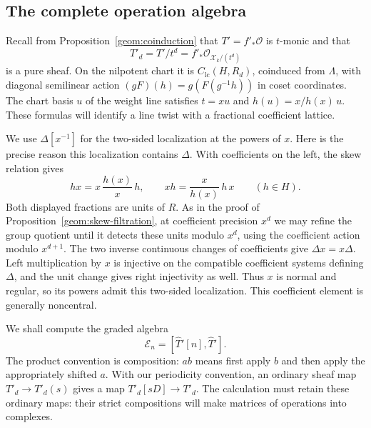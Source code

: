 \subsection{The complete operation algebra}

Recall from Proposition~\ref{geom:coinduction} that
$T'=f'_*\mathcal O$ is $t$-monic and that
\[
 T'_d=T'/t^d=f'_*\mathcal O_{\mathcal X_k/(t^d)}
\]
is a pure sheaf. On the nilpotent chart it is
$C_{\mathrm{lc}}(H,R_d)$, coinduced from $\Lambda$, with diagonal
semilinear action $(gF)(h)=g(F(g^{-1}h))$ in coset coordinates.
The chart basis $u$ of the weight line satisfies $t=xu$ and
$h(u)=x/h(x)\,u$. These formulas will identify a line twist with a
fractional coefficient lattice.

We use $\Delta[x^{-1}]$ for the two-sided localization at the powers
of $x$. Here is the precise reason this localization contains
$\Delta$. With coefficients on the left, the skew relation gives
\[
 hx=x\,\frac{h(x)}x\,h,
 \qquad
 xh=\frac{x}{h(x)}\,h\,x
 \qquad(h\in H).
\]
Both displayed fractions are units of $R$. As in the proof of
Proposition~\ref{geom:skew-filtration}, at coefficient precision
$x^d$ we may refine the group quotient until it detects these units
modulo $x^d$, using the coefficient action modulo $x^{d+1}$.
The two inverse continuous changes of coefficients give
$\Delta x=x\Delta$. Left multiplication by $x$ is injective on
the compatible coefficient systems defining $\Delta$, and the unit
change gives right injectivity as well. Thus $x$ is normal and regular,
so its powers admit this two-sided localization. This coefficient
element is generally noncentral.

We shall compute the graded algebra
\[
 \mathscr E_n=[\widehat T'[n],\widehat T'].
\]
The product convention is composition: $ab$ means first apply $b$
and then apply the appropriately shifted $a$. With our periodicity
convention, an ordinary sheaf map $T'_d\to T'_d(s)$ gives a map
$T'_d[sD]\to T'_d$. The calculation must retain these ordinary maps:
their strict compositions will make matrices of operations into
complexes.


